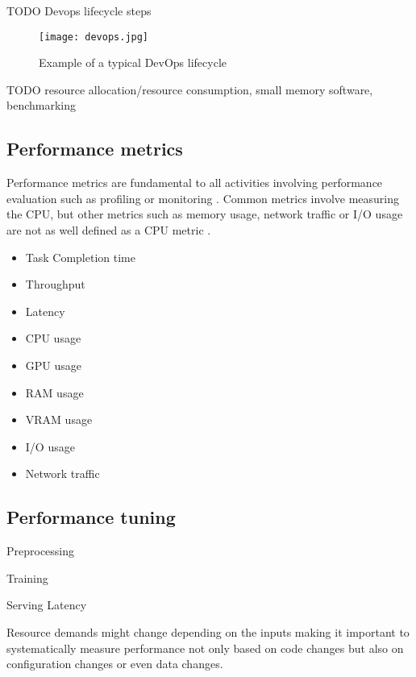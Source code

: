 TODO Devops lifecycle steps

\begin{figure}[h]
    \centering
    \texttt{[image: devops.jpg]}
    \caption{Example of a typical DevOps lifecycle}
    \label{fig:devops}
\end{figure}


TODO resource allocation/resource consumption, small memory software, benchmarking

\subsection{Performance metrics}

Performance metrics are fundamental to all activities involving performance evaluation such as profiling or monitoring \parencite{brunnertPerformanceorientedDevOpsResearch2015}. Common metrics involve measuring the CPU, but other metrics such as memory usage, network traffic or I/O usage are not as well defined as a CPU metric \parencite{brunnertPerformanceorientedDevOpsResearch2015}.

\begin{itemize}
    \item Task Completion time
    \item Throughput
    \item Latency
    \item CPU usage
    \item GPU usage
    \item RAM usage
    \item VRAM usage
    \item I/O usage
    \item Network traffic
\end{itemize}

\subsection{Performance tuning}

Preprocessing

Training

Serving Latency

Resource demands might change depending on the inputs \parencite{brunnertPerformanceorientedDevOpsResearch2015} making it important to systematically measure performance not only based on code changes but also on configuration changes or even data changes.

